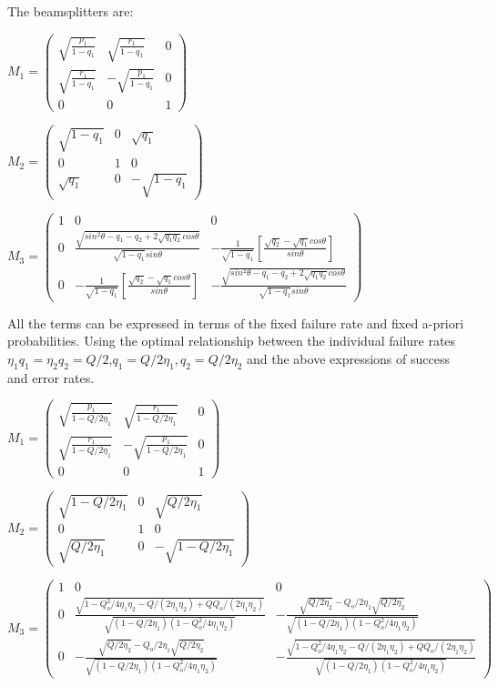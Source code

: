 \documentclass[12pt,oneside,english,reqno]{amsbook}
\numberwithin{section}{chapter}
\numberwithin{equation}{section}
\numberwithin{figure}{section}
\begin{document}
The beamsplitters are:

$M_{1}=\begin{pmatrix}\sqrt{\frac{p_{1}}{1-q_{1}}} & \sqrt{\frac{r_{1}}{1-q_{1}}} & 0\\
\sqrt{\frac{r_{1}}{1-q_{1}}} & -\sqrt{\frac{p_{1}}{1-q_{1}}} & 0\\
0 & 0 & 1
\end{pmatrix}$ 

$M_{2}=\begin{pmatrix}\sqrt{1-q_{1}} & 0 & \sqrt{q_{1}}\\
0 & 1 & 0\\
\sqrt{q_{1}} & 0 & -\sqrt{1-q_{1}}
\end{pmatrix}$ 

$M_{3}=\begin{pmatrix}1 & 0 & 0\\
0 & \frac{\sqrt{sin^{2}\theta-q_{1}-q_{2}+2\sqrt{q_{1}q_{2}}cos\theta}}{\sqrt{1-q_{1}}sin\theta} & -\frac{1}{\sqrt{1-q_{1}}}[\frac{\sqrt{q_{2}}-\sqrt{q_{1}}cos\theta}{sin\theta}]\\
0 & -\frac{1}{\sqrt{1-q_{1}}}[\frac{\sqrt{q_{2}}-\sqrt{q_{1}}cos\theta}{sin\theta}] & -\frac{\sqrt{sin^{2}\theta-q_{1}-q_{2}+2\sqrt{q_{1}q_{2}}cos\theta}}{\sqrt{1-q_{1}}sin\theta}
\end{pmatrix}$

All the terms can be expressed in terms of the fixed failure rate
and fixed a-priori probabilities. Using the optimal relationship between
the individual failure rates $\eta_{1}q_{1}=\eta_{2}q_{2}=Q/2$,$q_{1}=Q/2\eta_{1},q_{2}=Q/2\eta_{2}$
and the above expressions of success and error rates.

$M_{1}=\begin{pmatrix}\sqrt{\frac{p_{1}}{1-Q/2\eta_{1}}} & \sqrt{\frac{r_{1}}{1-Q/2\eta_{1}}} & 0\\
\sqrt{\frac{r_{1}}{1-Q/2\eta_{1}}} & -\sqrt{\frac{p_{1}}{1-Q/2\eta_{1}}} & 0\\
0 & 0 & 1
\end{pmatrix}$ 

$M_{2}=\begin{pmatrix}\sqrt{1-Q/2\eta_{1}} & 0 & \sqrt{Q/2\eta_{1}}\\
0 & 1 & 0\\
\sqrt{Q/2\eta_{1}} & 0 & -\sqrt{1-Q/2\eta_{1}}
\end{pmatrix}$

$M_{3}=\begin{pmatrix}1 & 0 & 0\\
0 & \frac{\sqrt{1-Q_{o}^{2}/4\eta_{1}\eta_{2}-Q/(2\eta_{1}\eta_{2})+QQ_{o}/(2\eta_{1}\eta_{2})}}{\sqrt{(1-Q/2\eta_{1})(1-Q_{o}^{2}/4\eta_{1}\eta_{2})}} & -\frac{\sqrt{Q/2\eta_{2}}-Q_{o}/2\eta_{1}\sqrt{Q/2\eta_{2}}}{\sqrt{(1-Q/2\eta_{1})(1-Q_{o}^{2}/4\eta_{1}\eta_{2})}}\\
0 & -\frac{\sqrt{Q/2\eta_{2}}-Q_{o}/2\eta_{1}\sqrt{Q/2\eta_{2}}}{\sqrt{(1-Q/2\eta_{1})(1-Q_{o}^{2}/4\eta_{1}\eta_{2})}} & -\frac{\sqrt{1-Q_{o}^{2}/4\eta_{1}\eta_{2}-Q/(2\eta_{1}\eta_{2})+QQ_{o}/(2\eta_{1}\eta_{2})}}{\sqrt{(1-Q/2\eta_{1})(1-Q_{o}^{2}/4\eta_{1}\eta_{2})}}
\end{pmatrix}$ 
\end{document}
